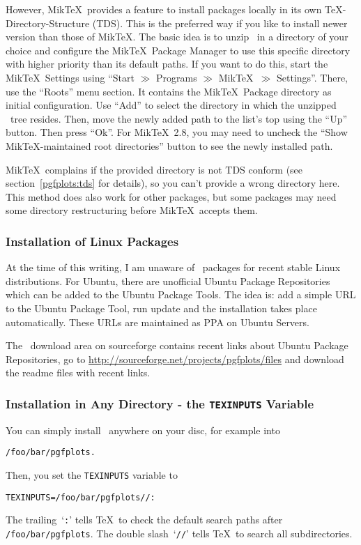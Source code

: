 However, Mik\TeX\ provides a feature to install packages locally in its own \TeX-Directory-Structure (TDS). This is the preferred way if you like to install newer version than those of Mik\TeX. The basic idea is to unzip \PGFPlots\ in a directory of your choice and configure the Mik\TeX\ Package Manager to use this specific directory with higher priority than its default paths. If you want to do this, start the Mik\TeX\ Settings using ``Start $\gg$ Programs $\gg$ Mik\TeX\ $\gg$ Settings''. There, use the ``Roots'' menu section. It contains the Mik\TeX\ Package directory as initial configuration. Use ``Add'' to select the directory in which the unzipped \PGFPlots\ tree resides. Then, move the newly added path to the list's top using the ``Up'' button. Then press ``Ok''. For Mik\TeX\ 2.8, you may need to uncheck the ``Show Mik\TeX-maintained root directories'' button to see the newly installed path.

Mik\TeX\ complains if the provided directory is not TDS conform (see section~\ref{pgfplots:tds} for details), so you can't provide a wrong directory here. This method does also work for other packages, but some packages may need some directory restructuring before Mik\TeX\ accepts them.

\subsubsection{Installation of Linux Packages}
At the time of this writing, I am unaware of \PGFPlots\ packages for recent stable Linux distributions. For Ubuntu, there are unofficial Ubuntu Package Repositories which can be added to the Ubuntu Package Tools. The idea is: add a simple URL to the Ubuntu Package Tool, run update and the installation takes place automatically. These URLs are maintained as PPA on Ubuntu Servers.

The \PGFPlots\ download area on sourceforge contains recent links about Ubuntu Package Repositories, go to 
\url{http://sourceforge.net/projects/pgfplots/files} 
and download the readme files with recent links.


\subsubsection{Installation in Any Directory - the \texttt{TEXINPUTS} Variable}
You can simply install \PGFPlots\ anywhere on your disc, for example into
\begin{verbatim}
/foo/bar/pgfplots.
\end{verbatim}
Then, you set the \texttt{TEXINPUTS} variable to
\begin{verbatim}
TEXINPUTS=/foo/bar/pgfplots//:
\end{verbatim}
The trailing~`\texttt{:}' tells \TeX\ to check the default search paths after \lstinline!/foo/bar/pgfplots!. The double slash~`\texttt{//}' tells \TeX\ to search all subdirectories.

